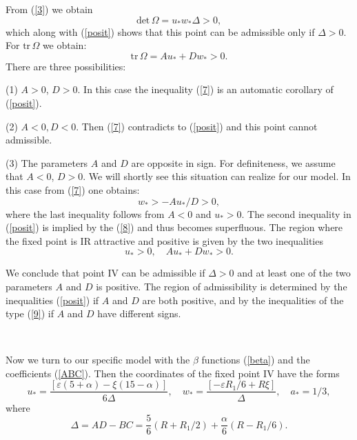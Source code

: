 \documentclass[12pt]{iopart}
\begin{document}
From (\ref{3}) we obtain
\begin{equation}
\textrm{det}\,\Omega = u_*w_*\Delta >0,
\label{6}
\end{equation}
which along with (\ref{posit}) shows that this point can be admissible
only if $\Delta >0$. For $\textrm{tr}\,\Omega$ we obtain:
\begin{equation}
\textrm{tr}\, \Omega = Au_* + Dw_* >0.
\label{7}
\end{equation}
There are three possibilities:

(1) $A>0$, $D>0$. In this case the inequality (\ref{7}) is an automatic
corollary of (\ref{posit}).

(2) $A<0, D<0$. Then (\ref{7}) contradicts to (\ref{posit}) and this
point cannot admissible.

(3) The parameters $A$ and $D$ are opposite in sign.
For definiteness, we assume that $A<0$, $D>0$.
We will shortly see this situation can realize for our model.
In this case  from (\ref{7}) one obtains:
\begin{equation}
w_* > -Au_*/D >0,
\label{8}
\end{equation}
where the last inequality follows from $A<0$ and $u_*>0$.
The second inequality
in (\ref{posit}) is implied by the (\ref{8}) and thus becomes superfluous.
The region where the fixed point is IR attractive and positive is given by
the two inequalities
\begin{equation}
u_*>0, \quad Au_*+Dw_* >0.
\label{9}
\end{equation}

We conclude that point IV can be admissible if $\Delta >0$ and
at least one of the two parameters $A$ and $D$ is positive. The region
of admissibility is determined by the inequalities (\ref{posit}) if $A$
and $D$ are both positive, and by the inequalities of the type (\ref{9})
if $A$ and $D$ have different signs.

\


Now we turn to our specific model with the $\beta$ functions (\ref{beta})
and the coefficients (\ref{ABC}). Then the coordinates of the fixed point
IV have the forms
\begin{equation}
u_{*} = \frac{[\varepsilon(5+\alpha)-\xi(15-\alpha)]}{6 \Delta},
\quad w_{*} = \frac{[-\varepsilon R_1/6+R\xi]}{\Delta}, \quad
a_{*}=1/3,
\label{wu4}
\end{equation}
where
\begin{equation}
\Delta = AD-BC = \frac{5}{6}(R+R_{1}/2) + \frac{\alpha}{6}(R-R_{1}/6).
\label{Delta}
\end{equation}
\end{document}
